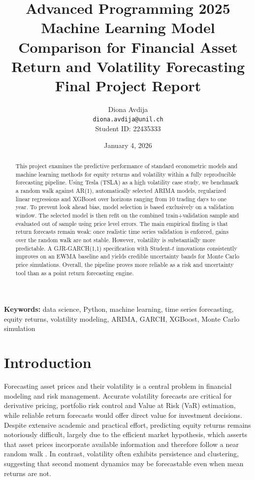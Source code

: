 \documentclass[11pt,a4paper]{article}
\title{%
    \Large \textbf{Advanced Programming 2025} \\
    \vspace{0.5cm}
    \LARGE \textbf{Machine Learning Model Comparison for Financial Asset Return and Volatility Forecasting} \\
    \vspace{0.3cm}
    \large Final Project Report
}
\author{%
    Diona Avdija \\
    \texttt{diona.avdija@unil.ch} \\
    Student ID: 22435333
}
\date{January 4, 2026}
\begin{document}
\maketitle
\thispagestyle{empty}

\begin{abstract}
\noindent
This project examines the predictive performance of standard econometric models and machine learning methods for equity returns and volatility within a fully reproducible forecasting pipeline. Using Tesla (TSLA) as a high volatility case study, we benchmark a random walk against AR(1), automatically selected ARIMA models, regularized linear regressions and XGBoost over horizons ranging from 10 trading days to one year. To prevent look ahead bias, model selection is based exclusively on a validation window. The selected model is then refit on the combined train+validation sample and evaluated out of sample using price level errors. The main empirical finding is that return forecasts remain weak: once realistic time series validation is enforced, gains over the random walk are not stable. However, volatility is substantially more predictable. A GJR-GARCH(1,1) specification with Student-$t$ innovations consistently improves on an EWMA baseline and yields credible uncertainty bands for Monte Carlo price simulations. Overall, the pipeline proves more reliable as a risk and uncertainty tool than as a point return forecasting engine.
\end{abstract}

\vspace{0.5cm}
\noindent\textbf{Keywords:} data science, Python, machine learning, time series forecasting, equity returns, volatility modeling, ARIMA, GARCH, XGBoost, Monte Carlo simulation

\newpage
\tableofcontents
\newpage


\section{Introduction}
\label{sec:introduction}
\begingroup
\setlength{\parskip}{0.35\baselineskip}
\setlength{\parindent}{1.25em}

\hspace*{\parindent}Forecasting asset prices and their volatility is a central problem in financial modeling and risk management. Accurate volatility forecasts are critical for derivative pricing, portfolio risk control and Value at Risk (VaR) estimation, while reliable return forecasts would offer direct value for investment decisions. Despite extensive academic and practical effort, predicting equity returns remains notoriously difficult, largely due to the efficient market hypothesis, which asserts that asset prices incorporate available information and therefore follow a near random walk \parencite{Fama1970}. In contrast, volatility often exhibits persistence and clustering, suggesting that second moment dynamics may be forecastable even when mean returns are not.
\end{document}
